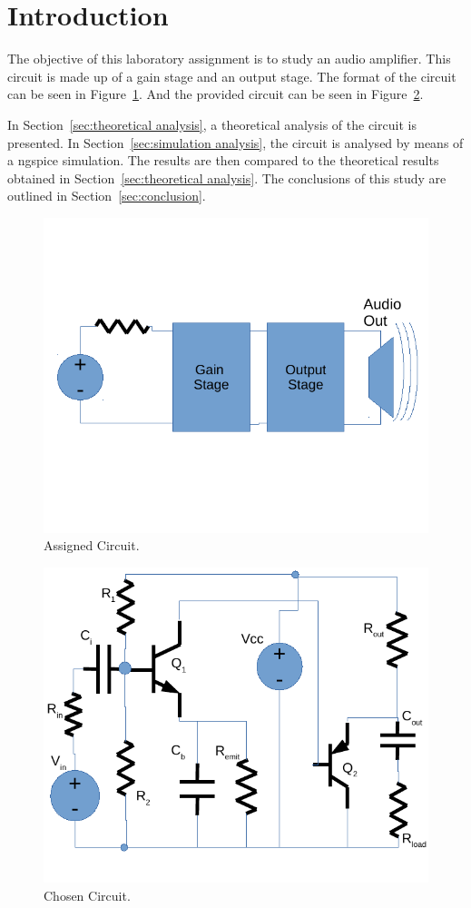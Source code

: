 \section{Introduction}
\label{sec:introduction}

\indent

The objective of this laboratory assignment is to study an audio amplifier.
This circuit is made up of a gain stage and an output stage.
The format of the circuit can be seen in Figure~\ref{fig:format}. And the  provided circuit can be seen in Figure~\ref{fig:circuit}.

In Section~\ref{sec:theoretical analysis}, a theoretical analysis of the circuit is
presented. In Section~\ref{sec:simulation analysis}, the circuit is analysed by
means of a ngspice simulation. The results are then compared to the theoretical results obtained in
Section~\ref{sec:theoretical analysis}. The conclusions of this study are outlined in
Section~\ref{sec:conclusion}.



\begin{figure}[h!] \centering
	\includegraphics[width=0.65\linewidth]{doc/circ_enunciado.pdf}
	\caption{Assigned Circuit.}
	\label{fig:format}
\end{figure}

\begin{figure}[h!] \centering
	\includegraphics[width=0.6\linewidth]{circ.pdf}
	\caption{Chosen Circuit.}
	\label{fig:circuit}
\end{figure}



